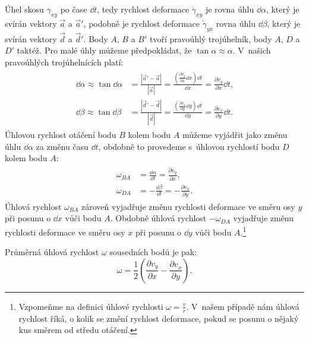 \documentclass[12pt]{article}
\begin{document}
Úhel skosu $\gamma_{xy}$ po čase $\dd t$, tedy rychlost deformace $\dot\gamma_{xy}$ je rovna úhlu $\dd\alpha$, který je svírán vektory $\vec{a}$ a $\vec{a}'$, podobně je rychlost deformace $\dot\gamma_{yx}$ rovna úhlu $\dd\beta$, který je svírán vektory $\vec{d}$ a $\vec{d}'$. Body $A$, $B$ a $B'$ tvoří pravoúhlý trojúhelník, body $A$, $D$ a $D'$ taktéž. Pro malé úhly můžeme předpokládat, že $\tan{\alpha} \approx \alpha$. V~našich pravoúhlých trojúhelnících platí:~\cite{YT:Kinematics_of_fluids_elements}~\cite{wiki:Strain_mechanics}~\cite{wiki:Infinitesimal_strain_theory}~\cite{wiki:Deformace}
\begin{align}
    \begin{split}
        \dd\alpha\approx\tan{\dd\alpha} &= \frac{\left|\vec{a}'-\vec{a}\right|}{\left|\vec{a}\right|} = \frac{\left(\frac{\partial v_y}{\partial x}\dd x\right)\dd t}{\dd x} = \frac{\partial v_y}{\partial x}\dd t\text{,}\\
        \dd\beta\approx\tan{\dd\beta} &= \frac{\left|\vec{d}'-\vec{d}\right|}{\left|\vec{d}\right|} = \frac{\left(\frac{\partial v_x}{\partial y}\dd y\right)\dd t}{\dd y} = \frac{\partial v_x}{\partial y}\dd t\text{.}
    \end{split}
\end{align}
Úhlovou rychlost otáčení bodu $B$ kolem bodu $A$ můžeme vyjádřit jako změnu úhlu $\dd\alpha$ za změnu času $\dd t$, obdobně to provedeme s~úhlovou rychlostí bodu $D$ kolem bodu $A$:~\cite{YT:Kinematics_of_fluids_elements}
\begin{align}
    \begin{split}
        \omega_{BA} &= \frac{\dd\alpha}{\dd t} = \frac{\partial v_y}{\partial x}\text{,}\\
        \omega_{DA} &= -\frac{\dd\beta}{\dd t} = -\frac{\partial v_x}{\partial y}\text{.}
    \end{split}
\end{align}
Úhlová rychlost $\omega_{BA}$ zároveň vyjadřuje změnu rychlosti deformace ve směru osy $y$ při posunu o $\dd x$ vůči bodu $A$. Obdobně úhlová rychlost $-\omega_{DA}$ vyjadřuje změnu rychlosti deformace ve směru osy $x$ při posunu o $\dd y$ vůči bodu $A$.\footnote{Vzpomeňme na definici úhlové rychlosti $\omega = \frac{v}{r}$. V~našem případě nám úhlová rychlost říká, o kolik se změní rychlost deformace, pokud se posunu o nějaký kus směrem od středu otáčení.}
\par
Průměrná úhlová rychlost $\omega$ sousedních bodů je pak:
\begin{equation}
    \omega = \frac{1}{2}\left(\frac{\partial v_y}{\partial x}-\frac{\partial v_x}{\partial y}\right)\text{.}
    \label{eq:omega}
\end{equation}
\end{document}

